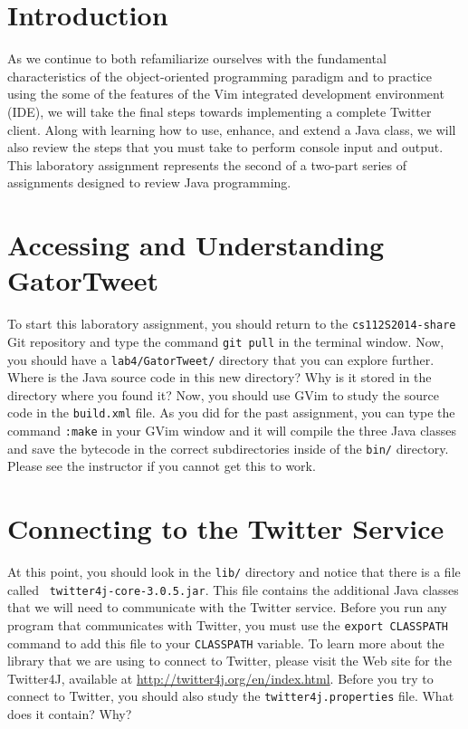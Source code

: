 


\usepackage[compact]{titlesec}



\section*{Introduction}

As we continue to both refamiliarize ourselves with the fundamental characteristics of the object-oriented programming paradigm
and to practice using the some of the features of the Vim integrated development environment (IDE), we will take the final steps
towards implementing a complete Twitter client.  Along with learning how to use, enhance, and extend a Java class, we will also
review the steps that you must take to perform console input and output. This laboratory assignment represents the second of a
two-part series of assignments designed to review Java programming.

\section*{Accessing and Understanding GatorTweet}

To start this laboratory assignment, you should return to the {\tt cs112S2014-share} Git repository and type the command {\tt git
  pull} in the terminal window.  Now, you should have a {\tt lab4/GatorTweet/} directory that you can explore further.  Where is
the Java source code in this new directory? Why is it stored in the directory where you found it? Now, you should use GVim to
study the source code in the {\tt build.xml} file.  As you did for the past assignment, you can type the command {\tt :make} in
your GVim window and it will compile the three Java classes and save the bytecode in the correct subdirectories inside of the
{\tt bin/} directory.  Please see the instructor if you cannot get this to work.

\section*{Connecting to the Twitter Service}

\begin{sloppypar} At this point, you should look in the {\tt lib/} directory and notice that there is a file called {\tt
    twitter4j-core-3.0.5.jar}.  This file contains the additional Java classes that we will need to communicate with the Twitter
  service. Before you run any program that communicates with Twitter, you must use the {\tt export CLASSPATH} command to add this
  file to your {\tt CLASSPATH} variable.  To learn more about the library that we are using to connect to Twitter, please visit
  the Web site for the Twitter4J, available at \url{http://twitter4j.org/en/index.html}. Before you try to connect to Twitter,
  you should also study the {\tt twitter4j.properties} file. What does it contain? Why?  \end{sloppypar}

